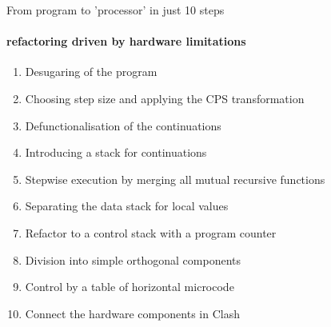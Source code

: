 \documentclass[pdf]{beamer}
\begin{document}
\begin{frame}{From program to 'processor' in just 10 steps}
\framesubtitle{refactoring driven by hardware limitations}
\begin{block}{}
\begin{enumerate}
 \item Desugaring of the program
 \item Choosing step size and applying the CPS transformation
 \item Defunctionalisation of the continuations
 \item Introducing a stack for continuations
 \item Stepwise execution by merging all mutual recursive functions
 \pause
 \item Separating the data stack for local values
 \item Refactor to a control stack with a program counter
 \item Division into simple orthogonal components

 \item Control by a table of horizontal microcode
 \item Connect the hardware components in Clash
\end{enumerate}
\end{block}


\end{frame}
\end{document}
